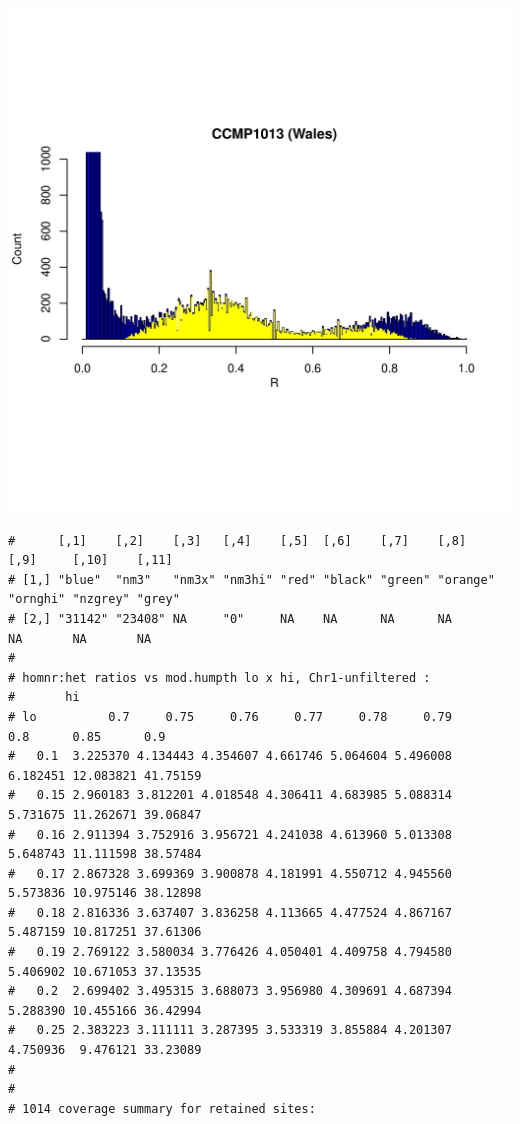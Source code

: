 \documentclass{article}\usepackage[]{graphicx}\usepackage[]{color}
\makeatletter
\def\maxwidth{ %
  \ifdim\Gin@nat@width>\linewidth
    \linewidth
  \else
    \Gin@nat@width
  \fi
}
\newenvironment{kframe}{%
 \def\at@end@of@kframe{}%
 \ifinner\ifhmode%
  \def\at@end@of@kframe{\end{minipage}}%
  \begin{minipage}{\columnwidth}%
 \fi\fi%
 \def\FrameCommand##1{\hskip\@totalleftmargin \hskip-\fboxsep
 \colorbox{shadecolor}{##1}\hskip-\fboxsep
     \hskip-\linewidth \hskip-\@totalleftmargin \hskip\columnwidth}%
 \MakeFramed {\advance\hsize-\width
   \@totalleftmargin\z@ \linewidth\hsize
   \@setminipage}}%
 {\par\unskip\endMakeFramed%
 \at@end@of@kframe}
\newenvironment{knitrout}{}{} %
\makeatother
\begin{document}
\begin{knitrout}
\includegraphics[width=\maxwidth]{FigS7-hwe-histo-figs-knitr/unnamed-chunk-10-19} 
\begin{kframe}\begin{verbatim}
#      [,1]    [,2]    [,3]   [,4]    [,5]  [,6]    [,7]    [,8]     [,9]     [,10]    [,11] 
# [1,] "blue"  "nm3"   "nm3x" "nm3hi" "red" "black" "green" "orange" "ornghi" "nzgrey" "grey"
# [2,] "31142" "23408" NA     "0"     NA    NA      NA      NA       NA       NA       NA
# 
# homnr:het ratios vs mod.humpth lo x hi, Chr1-unfiltered :
#       hi
# lo          0.7     0.75     0.76     0.77     0.78     0.79      0.8      0.85      0.9
#   0.1  3.225370 4.134443 4.354607 4.661746 5.064604 5.496008 6.182451 12.083821 41.75159
#   0.15 2.960183 3.812201 4.018548 4.306411 4.683985 5.088314 5.731675 11.262671 39.06847
#   0.16 2.911394 3.752916 3.956721 4.241038 4.613960 5.013308 5.648743 11.111598 38.57484
#   0.17 2.867328 3.699369 3.900878 4.181991 4.550712 4.945560 5.573836 10.975146 38.12898
#   0.18 2.816336 3.637407 3.836258 4.113665 4.477524 4.867167 5.487159 10.817251 37.61306
#   0.19 2.769122 3.580034 3.776426 4.050401 4.409758 4.794580 5.406902 10.671053 37.13535
#   0.2  2.699402 3.495315 3.688073 3.956980 4.309691 4.687394 5.288390 10.455166 36.42994
#   0.25 2.383223 3.111111 3.287395 3.533319 3.855884 4.201307 4.750936  9.476121 33.23089
# 
# 
# 1014 coverage summary for retained sites:

\end{verbatim}
\end{kframe}
\end{knitrout}
\end{document}
